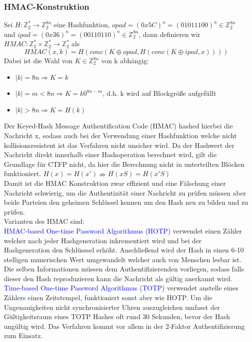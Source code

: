 \documentclass[a4paper,12pt,leqno]{article}
\newcommand{\blue}[1]{\textcolor{blue}{#1}}
\begin{document}
\subsubsection{HMAC-Konstruktion}
Sei $H: \mathbb{Z}_2^*\rightarrow\mathbb{Z}_2^{8n}$ eine Hashfunktion, $opad = (0x5C)^n=(01011100)^n\in \mathbb{Z}_2^{8n}$\\
und $ipad=(0x36)^n=(00110110)^n\in \mathbb{Z}_2^{8n}$, dann definieren wir $HMAC:\mathbb{Z}_2^*\times\mathbb{Z}_2^*\rightarrow\mathbb{Z}_2^*$ als
$$HMAC(x,k)=H\left( conc\left( K\oplus opad, H\left( conc\left( K\oplus ipad,x\right)\right)\right)\right)$$
Dabei ist die Wahl von $K\in\mathbb{Z}_2^{8n}$ von k abhängig:
\begin{itemize}
\item $|k|=8n\Rightarrow K=k$
\item $|k|=m<8n\Rightarrow K = k0^{8n-m}$, d.h. k wird auf Blockgröße aufgefüllt
\item $|k|>8n\Rightarrow K = H(k)$
\end{itemize}
Der Keyed-Hash Message Authentification Code (HMAC) hashed hierbei die Nachricht x, sodass auch bei der Verwendung einer Hashfunktion welche nicht kollisionsresistent ist das Verfahren nicht unsicher wird. Da der Hashwert der Nachricht direkt innerhalb einer Hashoperation berechnet wird, gilt die Grundlage für CTFP nicht, da hier die Berechnung nicht in unterteilten Blöcken funktioniert. $H(x)=H(x')\nRightarrow H(xS)=H(x'S)$\\
Damit ist die HMAC Konstruktion zwar effizient und eine Fälschung einer Nachricht schwierig, um die Authentizität einer Nachricht zu prüfen müssen aber beide Parteien den geheimen Schlüssel kennen um den Hash neu zu bilden und zu prüfen.\\
Varianten des HMAC sind:\\
\blue{HMAC-based One-time Password Algorithmus (HOTP)} verwendet einen Zähler welcher nach jeder Hashgeneration inkrementiert wird und bei der Hashgeneration den Schlüsssel erhöht. Anschließend wird der Hash in einen 6-10 stelligen numerischen Wert umgewandelt welcher auch von Menschen lesbar ist. Die selben Informationen müssen dem Authentifizierenden vorliegen, sodass falls dieser den Hash reproduzieren kann die Nachricht als gültig anerkannt wird. \\
\blue{Time-based One-time Password Algorithmus (TOTP)} verwendet anstelle eines Zählers einen Zeitstempel, funktioniert sonst aber wie HOTP. Um die Ungenauigkeiten nicht synchronisierter Uhren auszugleichen umfasst der Gültigkeitsraum eines TOTP Hashes oft rund 30 Sekunden, bevor der Hash ungültig wird. Das Verfahren kommt vor allem in der 2-Faktor Authentifizierung zum Einsatz.\\
\end{document}
